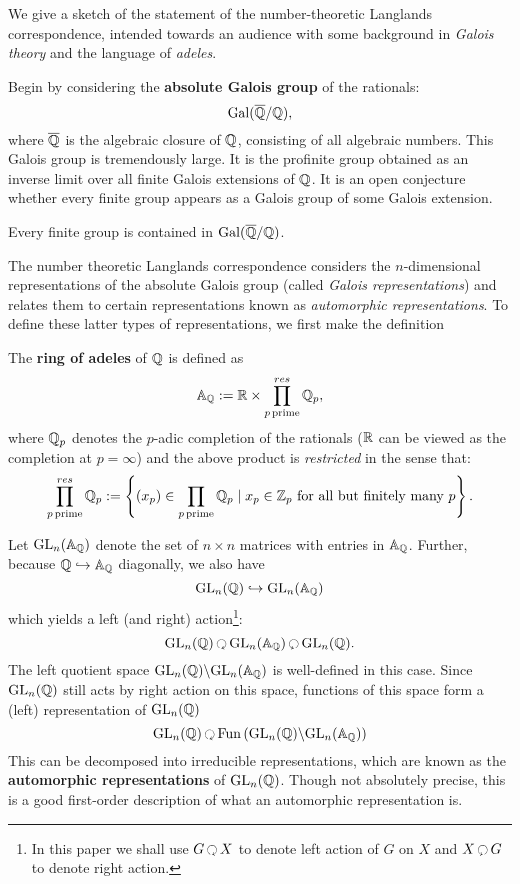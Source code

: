 We give a sketch of the statement of the number-theoretic Langlands correspondence, intended towards an audience with some background in \emph{Galois theory} and the language of \emph{adeles}. 

Begin by considering the \textbf{absolute Galois group} of the rationals:
\[
	\mathrm{Gal}(\overline{\mathbb{Q}}/\mathbb{Q}),
\]
where $\overline{\mathbb{Q}}$ is the algebraic closure of $\mathbb{Q}$, consisting of all algebraic numbers. This Galois group is tremendously large. It is the profinite group obtained as an inverse limit over all finite Galois extensions of $\mathbb{Q}$. It is an open conjecture whether every finite group appears as a Galois group of some Galois extension. 
\begin{conj}
	Every finite group is contained in $\mathrm{Gal}(\overline{\mathbb{Q}}/\mathbb{Q})$.
\end{conj}
The number theoretic Langlands correspondence considers the $n$-dimensional representations of the absolute Galois group (called \emph{Galois representations}) and relates them to certain representations known as \emph{automorphic representations}. To define these latter types of representations, we first make the definition
\begin{defn}
	The \textbf{ring of adeles} of $\mathbb{Q}$ is defined as 
	\[
		\mathbb A_{\mathbb{Q}} := \mathbb{R} \times \prod_{p\, \mathrm{prime}}^{res} \mathbb{Q}_p,
	\]
	where $\mathbb{Q}_p$ denotes the $p$-adic completion of the rationals \cite{bachman1964} ($\mathbb{R}$ can be viewed as the completion at $p=\infty$) and the above product is \emph{restricted} in the sense that:
	\[
		\prod_{p\, \mathrm{prime}}^{res} \mathbb{Q}_p := \left\{ (x_p) \in \prod_{p\, \mathrm{prime}} \mathbb{Q}_p \mid x_p \in \mathbb Z_p \text{ for all but finitely many } p\right\}.
	\]
\end{defn}
Let $\mathrm{GL}_n(\mathbb A_{\mathbb{Q}})$ denote the set of $n \times n$ matrices with entries in $\mathbb A_{\mathbb{Q}}$. Further, because $\mathbb{Q} \hookrightarrow \mathbb A_{\mathbb{Q}}$ diagonally, we also have 
\[
	\mathrm{GL}_n(\mathbb{Q}) \hookrightarrow \mathrm{GL}_n(\mathbb A_{\mathbb{Q}})
\]
which yields a left (and right) action\footnote{In this paper we shall use $G\lacts X$ to denote left action of $G$ on $X$ and $X \racts G$ to denote right action.}:
\[
	\GL_n(\qq) \lacts  \GL_n(\mathbb A_\qq) \racts  \GL_n(\qq).
\]
The left quotient space $\mathrm{GL}_n(\mathbb{Q}) \backslash \mathrm{GL}_n(\mathbb A_{\mathbb{Q}})$ is well-defined in this case. Since $\mathrm{GL}_n(\mathbb{Q})$ still acts by right action on this space, functions of this space form a (left) representation of $\mathrm{GL}_n(\mathbb{Q})$
\[
	\GL_n(\qq) \lacts \mathrm{Fun}\left( \GL_n(\qq) \backslash \GL_n(\mathbb A_\qq) \right)
\]
This can be decomposed into irreducible representations, which are known as the \textbf{automorphic representations} of $\mathrm{GL}_n(\mathbb{Q})$.
Though not absolutely precise, this is a good first-order description of what an automorphic representation is. 

